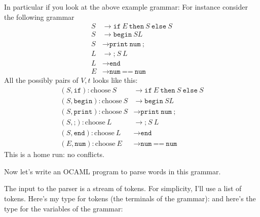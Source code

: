 In particular if you look at the above example grammar:
For instance consider the following grammar
\begin{align*}
  S &\rightarrow \texttt{if} \ E \ \texttt{then} \ S \ \texttt{else} \ S \\
  S &\rightarrow \texttt{begin} \ S L \\
  S &\rightarrow \texttt{print} \ \texttt{num} \ \texttt{;}\\
  L &\rightarrow \texttt{;} \ S \ L \\
  L &\rightarrow \texttt{end} \\
  E &\rightarrow \texttt{num} \ \texttt{==} \ \texttt{num} 
\end{align*}
All the possibly pairs of $V,t$ looks like this:
\begin{align*}
  (S,\texttt{if}): \text{choose} \ S &\rightarrow \texttt{if} \ E \ \texttt{then} \ S \ \texttt{else} \ S \\
  (S,\texttt{begin}): \text{choose} \ S &\rightarrow \texttt{begin} \ S L \\
  (S,\texttt{print}): \text{choose} \ S &\rightarrow \texttt{print} \ \texttt{num} \ \texttt{;}\\
  (S,\texttt{;}): \text{choose} \ L &\rightarrow \texttt{;} \ S \ L \\
  (S,\texttt{end}): \text{choose} \ L &\rightarrow \texttt{end} \\
  (E,\texttt{num}): \text{choose} \ E &\rightarrow \texttt{num} \ \texttt{==} \ \texttt{num} 
\end{align*}
This is a home run: no conflicts.

Now let's write an OCAML program to parse words in this grammar. 

The input to the parser is a stream of tokens.
For simplicity, I'll use a list of tokens.
Here's my type for tokens (the terminals of the grammar):
{\small
{}
}
and here's the type for the variables of the grammar:
{\small
{}
}
